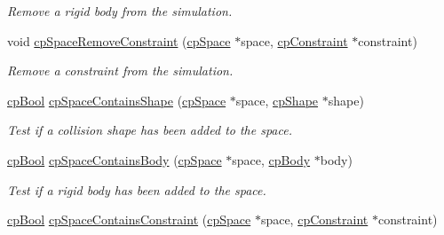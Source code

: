 \begin{DoxyCompactItemize}
\begin{DoxyCompactList}\small\item\em Remove a rigid body from the simulation. \end{DoxyCompactList}\item 
\hypertarget{group__cp_space_gae6a15d5809c8ca1cd786518b0198061b}{}void \hyperlink{group__cp_space_gae6a15d5809c8ca1cd786518b0198061b}{cp\+Space\+Remove\+Constraint} (\hyperlink{structcp_space}{cp\+Space} $\ast$space, \hyperlink{structcp_constraint}{cp\+Constraint} $\ast$constraint)\label{group__cp_space_gae6a15d5809c8ca1cd786518b0198061b}

\begin{DoxyCompactList}\small\item\em Remove a constraint from the simulation. \end{DoxyCompactList}\item 
\hypertarget{group__cp_space_ga24236a160025c41df498804da57ebc08}{}\hyperlink{group__basic_types_gabc5e752c48f3449ca26ef413ecbd647e}{cp\+Bool} \hyperlink{group__cp_space_ga24236a160025c41df498804da57ebc08}{cp\+Space\+Contains\+Shape} (\hyperlink{structcp_space}{cp\+Space} $\ast$space, \hyperlink{structcp_shape}{cp\+Shape} $\ast$shape)\label{group__cp_space_ga24236a160025c41df498804da57ebc08}

\begin{DoxyCompactList}\small\item\em Test if a collision shape has been added to the space. \end{DoxyCompactList}\item 
\hypertarget{group__cp_space_ga8aededc0029d164ebd419e6012a91034}{}\hyperlink{group__basic_types_gabc5e752c48f3449ca26ef413ecbd647e}{cp\+Bool} \hyperlink{group__cp_space_ga8aededc0029d164ebd419e6012a91034}{cp\+Space\+Contains\+Body} (\hyperlink{structcp_space}{cp\+Space} $\ast$space, \hyperlink{structcp_body}{cp\+Body} $\ast$body)\label{group__cp_space_ga8aededc0029d164ebd419e6012a91034}

\begin{DoxyCompactList}\small\item\em Test if a rigid body has been added to the space. \end{DoxyCompactList}\item 
\hypertarget{group__cp_space_ga2e4cef3632535e485f1e0645e60c3ad2}{}\hyperlink{group__basic_types_gabc5e752c48f3449ca26ef413ecbd647e}{cp\+Bool} \hyperlink{group__cp_space_ga2e4cef3632535e485f1e0645e60c3ad2}{cp\+Space\+Contains\+Constraint} (\hyperlink{structcp_space}{cp\+Space} $\ast$space, \hyperlink{structcp_constraint}{cp\+Constraint} $\ast$constraint)\label{group__cp_space_ga2e4cef3632535e485f1e0645e60c3ad2}


\end{DoxyCompactItemize}
